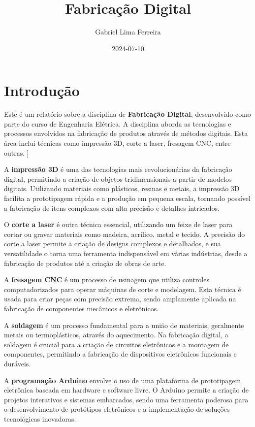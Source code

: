 \documentclass[
]{book}
\title{Fabricação Digital}
\author{Gabriel Lima Ferreira}
\date{2024-07-10}
\begin{document}
\maketitle

{
\setcounter{tocdepth}{1}
\tableofcontents
}
\chapter{Introdução}\label{introduuxe7uxe3o}

Este é um relatório sobre a disciplina de \textbf{Fabricação Digital}, desenvolvido como parte do curso de Engenharia Elétrica. A disciplina aborda as tecnologias e processos envolvidos na fabricação de produtos através de métodos digitais. Esta área inclui técnicas como impressão 3D, corte a laser, fresagem CNC, entre outras.
{]}

A \textbf{impressão 3D} é uma das tecnologias mais revolucionárias da fabricação digital, permitindo a criação de objetos tridimensionais a partir de modelos digitais. Utilizando materiais como plásticos, resinas e metais, a impressão 3D facilita a prototipagem rápida e a produção em pequena escala, tornando possível a fabricação de itens complexos com alta precisão e detalhes intricados.

O \textbf{corte a laser} é outra técnica essencial, utilizando um feixe de laser para cortar ou gravar materiais como madeira, acrílico, metal e tecido. A precisão do corte a laser permite a criação de designs complexos e detalhados, e sua versatilidade o torna uma ferramenta indispensável em várias indústrias, desde a fabricação de produtos até a criação de obras de arte.

A \textbf{fresagem CNC} é um processo de usinagem que utiliza controles computadorizados para operar máquinas de corte e modelagem. Esta técnica é usada para criar peças com precisão extrema, sendo amplamente aplicada na fabricação de componentes mecânicos e eletrônicos.

A \textbf{soldagem} é um processo fundamental para a união de materiais, geralmente metais ou termoplásticos, através do aquecimento. Na fabricação digital, a soldagem é crucial para a criação de circuitos eletrônicos e a montagem de componentes, permitindo a fabricação de dispositivos eletrônicos funcionais e duráveis.

A \textbf{programação Arduino} envolve o uso de uma plataforma de prototipagem eletrônica baseada em hardware e software livre. O Arduino permite a criação de projetos interativos e sistemas embarcados, sendo uma ferramenta poderosa para o desenvolvimento de protótipos eletrônicos e a implementação de soluções tecnológicas inovadoras.
\end{document}

